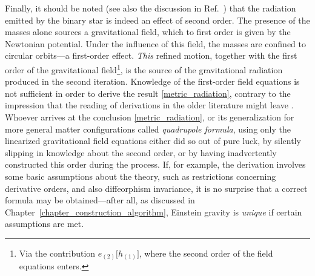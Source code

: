 Finally, it should be noted (see also the discussion in Ref.~\cite{poisson2014gravity}) that the radiation emitted by the binary star is indeed an effect of second order. The presence of the masses alone sources a gravitational field, which to first order is given by the Newtonian potential. Under the influence of this field, the masses are confined to circular orbits---a first-order effect. \emph{This} refined motion, together with the first order of the gravitational field\footnote{Via the contribution $e_{(2)}\lbrack h_{(1)}\rbrack$, where the second order of the field equations enters.}, is the source of the gravitational radiation produced in the second iteration. Knowledge of the first-order field equations is not sufficient in order to derive the result \eqref{metric_radiation}, contrary to the impression that the reading of derivations in the older literature might leave \cite{Misner_1973}. Whoever arrives at the conclusion \eqref{metric_radiation}, or its generalization for more general matter configurations called \emph{quadrupole formula}, using only the linearized gravitational field equations either did so out of pure luck, by silently slipping in knowledge about the second order, or by having inadvertently constructed this order during the process. If, for example, the derivation involves some basic assumptions about the theory, such as restrictions concerning derivative orders, and also diffeorphism invariance, it is no surprise that a correct formula may be obtained---after all, as discussed in Chapter~\ref{chapter_construction_algorithm}, Einstein gravity is \emph{unique} if certain assumptions are met.

